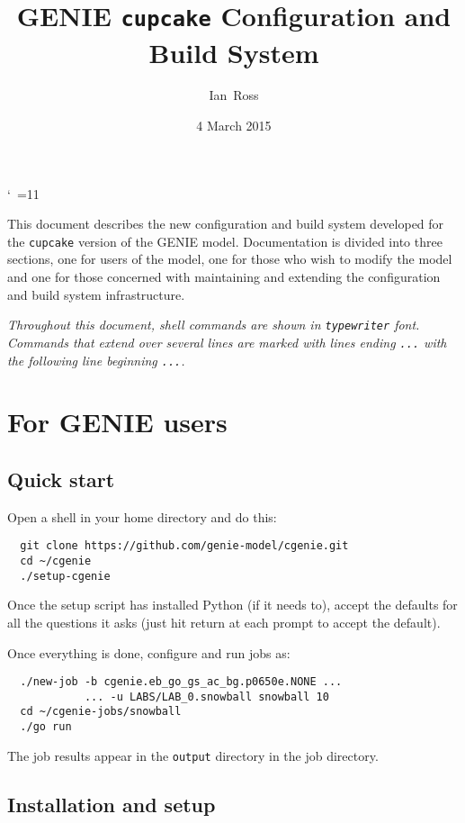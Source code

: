 \documentclass[a4paper,10pt,article]{memoir}
\title{GENIE \texttt{cupcake} Configuration and Build System}
\author{Ian~Ross}
\date{4 March 2015}
\begin{document}
\catcode`~=11    %

\maketitle

This document describes the new configuration and build system
developed for the \texttt{cupcake} version of the GENIE model.
Documentation is divided into three sections, one for users of the
model, one for those who wish to modify the model and one for those
concerned with maintaining and extending the configuration and build
system infrastructure.

\emph{Throughout this document, shell commands are shown in
  \texttt{typewriter} font.  Commands that extend over several lines
  are marked with lines ending \texttt{...} with the following line
  beginning \texttt{...}.}

\chapter{For GENIE users}

\section{Quick start}

Open a shell in your home directory and do this:
\begin{verbatim}
  git clone https://github.com/genie-model/cgenie.git
  cd ~/cgenie
  ./setup-cgenie
\end{verbatim}
Once the setup script has installed Python (if it needs to), accept
the defaults for all the questions it asks (just hit return at each
prompt to accept the default).

Once everything is done, configure and run jobs as:
\begin{verbatim}
  ./new-job -b cgenie.eb_go_gs_ac_bg.p0650e.NONE ...
            ... -u LABS/LAB_0.snowball snowball 10
  cd ~/cgenie-jobs/snowball
  ./go run
\end{verbatim}
The job results appear in the \texttt{output} directory in the job
directory.

\section{Installation and setup}
\end{document}
